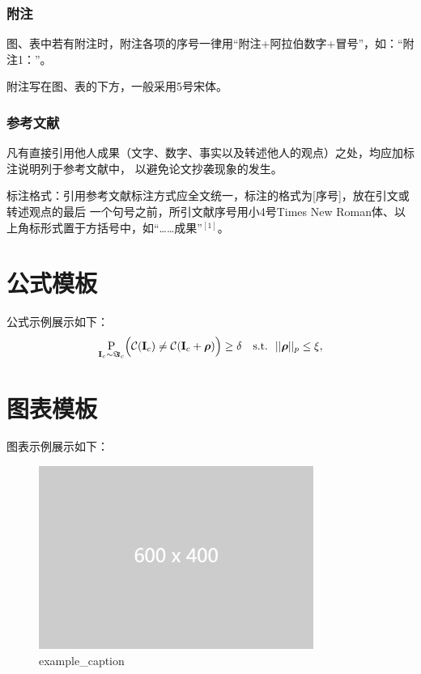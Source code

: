 \documentclass[zihao=-4]{ctexart}
\begin{document}
\begin{spacing}{1.5}
\subsubsection{附注}
图、表中若有附注时，附注各项的序号一律用“附注+阿拉伯数字+冒号”，如：“附注1：”。

附注写在图、表的下方，一般采用5号宋体。

\subsubsection{参考文献}
凡有直接引用他人成果（文字、数字、事实以及转述他人的观点）之处，均应加标注说明列于参考文献中，
以避免论文抄袭现象的发生。

标注格式：引用参考文献标注方式应全文统一，标注的格式为[序号]，放在引文或转述观点的最后
一个句号之前，所引文献序号用小4号Times New Roman体、以上角标形式置于方括号中，如“……成果”$^{[1]}$。
\section{公式模板}

公式示例展示如下：
\begin{align}
\underset{{\bf I}_c \sim \boldsymbol\Im_c}{\mathrm{\text P}} \Big( \mathcal C({\bf I}_c) \neq \mathcal C({\bf I}_c + \boldsymbol \rho) \Big) \geq \delta ~~~\text{s.t.}~~||\boldsymbol\rho||_p \leq \xi,
\label{eq:def1}
\end{align}

\section{图表模板}
图表示例展示如下：

\begin{figure}[H] %
    \centering %
    \includegraphics[width=0.8\textwidth]{example-image-2.png} %
    \caption{example\_caption} %
    \label{example_label} %
\end{figure}


\end{spacing}
\end{document}
